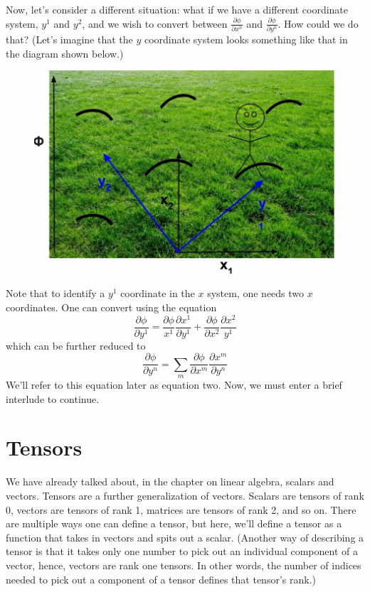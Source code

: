 Now, let's consider a different situation: what if we have a different coordinate system, $y^1$ and $y^2$, and we wish to convert between $\frac{\partial\phi}{\partial x^n}$ and $\frac{\partial\phi}{\partial y^n}$. How could we do that? (Let's imagine that the $y$ coordinate system looks something like that in the diagram shown below.)
\begin{figure}[H]
    \centering
    \includegraphics{newcor.jpg}
\end{figure}
Note that to identify a $y^1$ coordinate in the $x$ system, one needs two $x$ coordinates. One can convert using the equation 
\begin{equation*}
    \frac{\partial\phi}{\partial y^1}=\frac{\partial\phi}{x^1}\frac{\partial x^1}{\partial y^1}+\frac{\partial\phi}{\partial x^2}\frac{\partial x^2}{y^1}
\end{equation*}
which can be further reduced to
\begin{equation}
    \frac{\partial\phi}{\partial y^n}=\sum\limits_m\frac{\partial\phi}{\partial x^m}\frac{\partial x^m}{\partial y^n}
\end{equation}
We'll refer to this equation later as equation two. Now, we must enter a brief interlude to continue.
\section{Tensors}
We have already talked about, in the chapter on linear algebra, scalars and vectors. Tensors are a further generalization of vectors. Scalars are tensors of rank 0, vectors are tensors of rank 1, matrices are tensors of rank 2, and so on. There are multiple ways one can define a tensor, but here, we'll define a tensor as a function that takes in vectors and spits out a scalar. (Another way of describing a tensor is that it takes only one number to pick out an individual component of a vector, hence, vectors are rank one tensors. In other words, the number of indices needed to pick out a component of a tensor defines that tensor's rank.)

